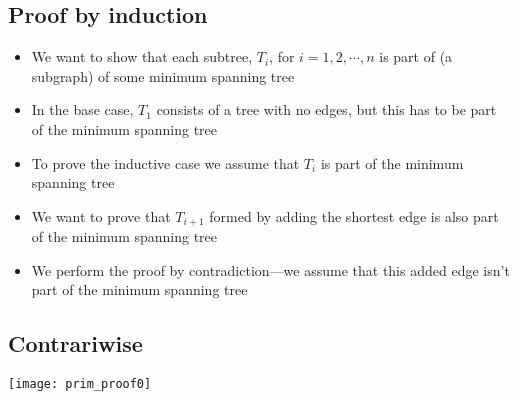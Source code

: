 \begin{slide}
\section[-1]{Proof by induction}

\begin{PauseHighLight}
  \begin{itemize}
  \item We want to show that each subtree, $T_i$, for $i=1, 2, \cdots, n$ is
    part of (a subgraph) of some minimum spanning tree\pause
  \item In the base case, $T_1$ consists of a tree with no edges,
    but this has to be part of the minimum spanning tree\pause
  \item To prove the inductive case we assume that $T_i$ is part of the
    minimum spanning tree\pause
  \item We want to prove that $T_{i+1}$ formed by adding the shortest
    edge is also part of the minimum spanning tree\pause
  \item We perform the proof by contradiction\pause---we assume that
    this added edge isn't part of the minimum spanning tree\pause
  \end{itemize}
\end{PauseHighLight}

\end{slide}


\begin{slide}
\section[-2]{Contrariwise}
\pb
\pause

\begin{center}
  \texttt{[image: prim\_proof0]}
  {}
\end{center}


\end{slide}


